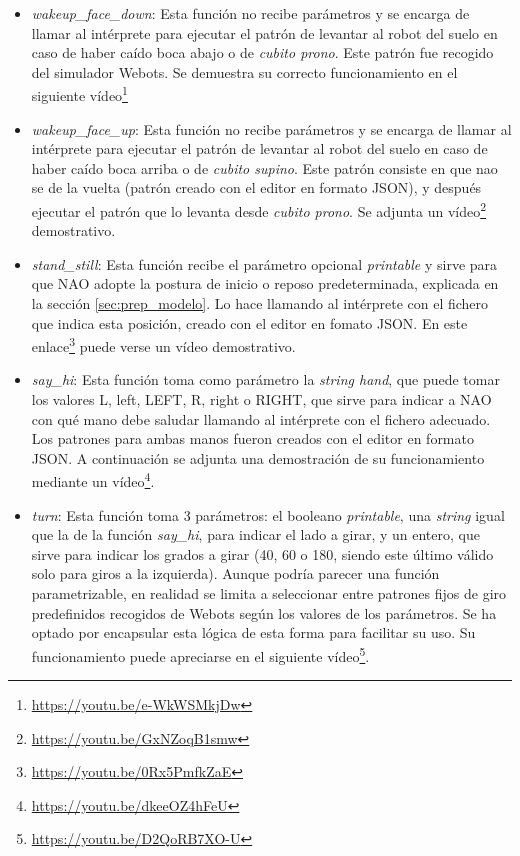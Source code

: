 \begin{itemize}
    \item \textit{wakeup\_face\_down}: Esta función no recibe parámetros y se encarga de llamar al intérprete para ejecutar el patrón de levantar al robot del suelo en caso de haber caído boca abajo o de \textit{cubito prono}. Este patrón fue recogido del simulador Webots. Se demuestra su correcto funcionamiento en el siguiente vídeo\footnote{\url{https://youtu.be/e-WkWSMkjDw}}
    \item \textit{wakeup\_face\_up}: Esta función no recibe parámetros y se encarga de llamar al intérprete para ejecutar el patrón de levantar al robot del suelo en caso de haber caído boca arriba o de \textit{cubito supino}. Este patrón consiste en que nao se de la vuelta (patrón creado con el editor en formato JSON), y después ejecutar el patrón que lo levanta desde \textit{cubito prono}. Se adjunta un vídeo\footnote{\url{https://youtu.be/GxNZoqB1smw}} demostrativo.
    \item \textit{stand\_still}: Esta función recibe el parámetro opcional \textit{printable} y sirve para que NAO adopte la postura de inicio o reposo predeterminada, explicada en la sección \ref{sec:prep_modelo}. Lo hace llamando al intérprete con el fichero que indica esta posición, creado con el editor en fomato JSON. En este enlace\footnote{\url{https://youtu.be/0Rx5PmfkZaE}} puede verse un vídeo demostrativo.
    \item \textit{say\_hi}: Esta función toma como parámetro la \textit{string hand}, que puede tomar los valores L, left, LEFT, R, right o RIGHT, que sirve para indicar a NAO con qué mano debe saludar llamando al intérprete con el fichero adecuado. Los patrones para ambas manos fueron creados con el editor en formato JSON. A continuación se adjunta una demostración de su funcionamiento mediante un vídeo\footnote{\url{https://youtu.be/dkeeOZ4hFeU}}.  
    \item \textit{turn}: Esta función toma 3 parámetros: el booleano \textit{printable}, una \textit{string} igual que la de la función \textit{say\_hi}, para indicar el lado a girar, y un entero, que sirve para indicar los grados a girar (40, 60 o 180, siendo este último válido solo para giros a la izquierda). Aunque podría parecer una función parametrizable, en realidad se limita a seleccionar entre patrones fijos de giro predefinidos recogidos de Webots según los valores de los parámetros. Se ha optado por encapsular esta lógica de esta forma para facilitar su uso. Su funcionamiento puede apreciarse en el siguiente vídeo\footnote{\url{https://youtu.be/D2QoRB7XO-U}}.

\end{itemize}
